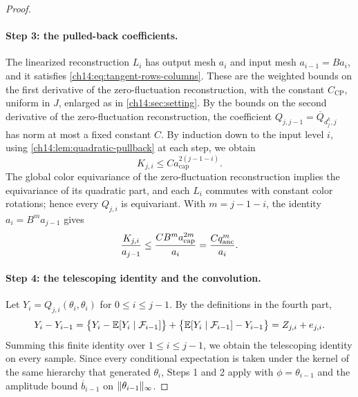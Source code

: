 \begin{proof}
\paragraph{Step 3: the pulled-back coefficients.}
The linearized reconstruction $L_i$ has output mesh $a_i$ and input mesh $a_{i-1}=Ba_i$, and it satisfies \eqref{ch14:eq:tangent-rows-columns}. These are the weighted bounds on the first derivative of the zero-fluctuation reconstruction, with the constant $C_{\mathrm{CP}}$, uniform in $J$, enlarged as in \cref{ch14:sec:setting}. By the bounds on the second derivative of the zero-fluctuation reconstruction, the coefficient $Q_{j,j-1}=\overline Q_{d_j^k,j}$ has norm at most a fixed constant $C$. By induction down to the input level $i$, using \cref{ch14:lem:quadratic-pullback} at each step, we obtain
\[
 K_{j,i}\le Ca_{\mathrm{cap}}^{2(j-1-i)}.
\]
The global color equivariance of the zero-fluctuation reconstruction implies the equivariance of its quadratic part, and each $L_i$ commutes with constant color rotations; hence every $Q_{j,i}$ is equivariant. With $m=j-1-i$, the identity $a_i=B^ma_{j-1}$ gives
\begin{equation}\label{ch14:eq:physical-contraction}
 \frac{K_{j,i}}{a_{j-1}}\le\frac{CB^ma_{\mathrm{cap}}^{2m}}{a_i}=\frac{Cq_{\mathrm{anc}}^m}{a_i}.
\end{equation}

\paragraph{Step 4: the telescoping identity and the convolution.}
Let $Y_i=Q_{j,i}(\theta_i,\theta_i)$ for $0\le i\le j-1$. By the definitions in the fourth part,
\[
 Y_i-Y_{i-1}=\bigl\{Y_i-\mathbb E[Y_i\mid\mathcal F_{i-1}]\bigr\}+\bigl\{\mathbb E[Y_i\mid\mathcal F_{i-1}]-Y_{i-1}\bigr\}=Z_{j,i}+e_{j,i}.
\]
Summing this finite identity over $1\le i\le j-1$, we obtain the telescoping identity on every sample. Since every conditional expectation is taken under the kernel of the same hierarchy that generated $\theta_i$, Steps 1 and 2 apply with $\phi=\theta_{i-1}$ and the amplitude bound $\overline b_{i-1}$ on $\lVert \theta_{i-1}\rVert_\infty$.


\end{proof}
